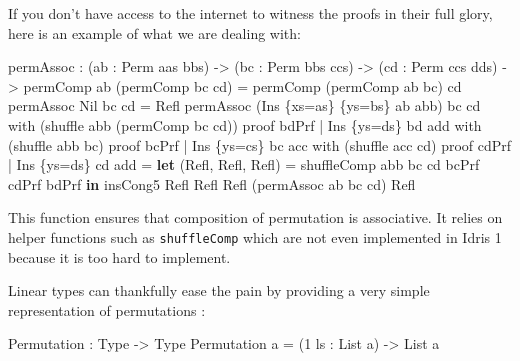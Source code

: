\documentclass[
]{article}
\newenvironment{Shaded}{}{}
\newcommand{\DataTypeTok}[1]{\textcolor[rgb]{0.56,0.13,0.00}{#1}}
\newcommand{\DecValTok}[1]{\textcolor[rgb]{0.25,0.63,0.44}{#1}}
\newcommand{\KeywordTok}[1]{\textcolor[rgb]{0.00,0.44,0.13}{\textbf{#1}}}
\newcommand{\NormalTok}[1]{#1}
\newcommand{\OperatorTok}[1]{\textcolor[rgb]{0.40,0.40,0.40}{#1}}
\newcommand{\OtherTok}[1]{\textcolor[rgb]{0.00,0.44,0.13}{#1}}
\begin{document}
If you don't have access to the internet to witness the proofs in their
full glory, here is an example of what we are dealing with:

\begin{Shaded}
\begin{Highlighting}[]
\NormalTok{permAssoc }\OperatorTok{:}\NormalTok{ (ab }\OperatorTok{:} \DataTypeTok{Perm}\NormalTok{ aas bbs) }\OtherTok{{-}\textgreater{}}\NormalTok{ (bc }\OperatorTok{:} \DataTypeTok{Perm}\NormalTok{ bbs ccs) }
         \OtherTok{{-}\textgreater{}}\NormalTok{ (cd }\OperatorTok{:} \DataTypeTok{Perm}\NormalTok{ ccs dds)}
         \OtherTok{{-}\textgreater{}}\NormalTok{ permComp ab (permComp bc cd) }\OtherTok{=}\NormalTok{ permComp (permComp ab bc) cd}
\NormalTok{permAssoc }\DataTypeTok{Nil}\NormalTok{ bc cd }\OtherTok{=} \DataTypeTok{Refl}
\NormalTok{permAssoc (}\DataTypeTok{Ins}\NormalTok{ \{xs}\OtherTok{=}\NormalTok{as\} \{ys}\OtherTok{=}\NormalTok{bs\} ab\textquotesingle{} abb) bc cd }
\NormalTok{  with (shuffle abb (permComp bc cd)) proof bdPrf}
  \OperatorTok{|} \DataTypeTok{Ins}\NormalTok{ \{ys}\OtherTok{=}\NormalTok{ds\} bd\textquotesingle{} add with (shuffle abb bc) proof bcPrf}
    \OperatorTok{|} \DataTypeTok{Ins}\NormalTok{ \{ys}\OtherTok{=}\NormalTok{cs\} bc\textquotesingle{} acc with (shuffle acc cd) proof cdPrf}
      \OperatorTok{|} \DataTypeTok{Ins}\NormalTok{ \{ys}\OtherTok{=}\NormalTok{ds\textquotesingle{}\} cd\textquotesingle{} ad\textquotesingle{}d }\OtherTok{=}
        \KeywordTok{let}\NormalTok{ (}\DataTypeTok{Refl}\NormalTok{, }\DataTypeTok{Refl}\NormalTok{, }\DataTypeTok{Refl}\NormalTok{) }\OtherTok{=}\NormalTok{ shuffleComp abb bc cd bcPrf cdPrf bdPrf}
         \KeywordTok{in}\NormalTok{ insCong5 }\DataTypeTok{Refl} \DataTypeTok{Refl} \DataTypeTok{Refl}\NormalTok{ (permAssoc ab\textquotesingle{} bc\textquotesingle{} cd\textquotesingle{}) }\DataTypeTok{Refl}
\end{Highlighting}
\end{Shaded}

This function ensures that composition of permutation is associative. It
relies on helper functions such as \texttt{shuffleComp} which are not
even implemented in Idris 1 because it is too hard to implement.

Linear types can thankfully ease the pain by providing a very simple
representation of permutations :

\begin{Shaded}
\begin{Highlighting}[]
\DataTypeTok{Permutation} \OperatorTok{:} \DataTypeTok{Type} \OtherTok{{-}\textgreater{}} \DataTypeTok{Type}
\DataTypeTok{Permutation}\NormalTok{ a }\OtherTok{=}\NormalTok{ (}\DecValTok{1}\NormalTok{ ls }\OperatorTok{:} \DataTypeTok{List}\NormalTok{ a) }\OtherTok{{-}\textgreater{}} \DataTypeTok{List}\NormalTok{ a}
\end{Highlighting}
\end{Shaded}
\end{document}
